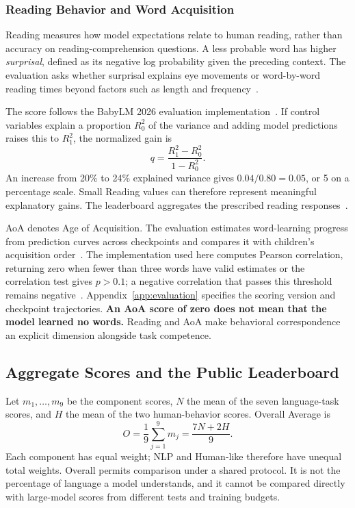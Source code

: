 \subsubsection{Reading Behavior and Word Acquisition}

Reading measures how model expectations relate to human reading, rather than accuracy on reading-comprehension questions. A less probable word has higher \emph{surprisal}, defined as its negative log probability given the preceding context. The evaluation asks whether surprisal explains eye movements or word-by-word reading times beyond factors such as length and frequency~\citep{devarda2024cloze}.

The score follows the BabyLM 2026 evaluation implementation~\citep{babylm2026evaluation}. If control variables explain a proportion $R_0^2$ of the variance and adding model predictions raises this to $R_1^2$, the normalized gain is
\begin{equation}
q=\frac{R_1^2-R_0^2}{1-R_0^2}.
\end{equation}
An increase from 20\% to 24\% explained variance gives $0.04/0.80=0.05$, or 5 on a percentage scale. Small Reading values can therefore represent meaningful explanatory gains. The leaderboard aggregates the prescribed reading responses~\citep{babylm2026leaderboard}.

AoA denotes Age of Acquisition. The evaluation estimates word-learning progress from prediction curves across checkpoints and compares it with children's acquisition order~\citep{chang2022word}. The implementation used here computes Pearson correlation, returning zero when fewer than three words have valid estimates or the correlation test gives $p>0.1$; a negative correlation that passes this threshold remains negative~\citep{babylm2026evaluation}. Appendix~\ref{app:evaluation} specifies the scoring version and checkpoint trajectories. \textbf{An AoA score of zero does not mean that the model learned no words.} Reading and AoA make behavioral correspondence an explicit dimension alongside task competence.

\subsection{Aggregate Scores and the Public Leaderboard}

Let $m_1,\ldots,m_9$ be the component scores, $N$ the mean of the seven language-task scores, and $H$ the mean of the two human-behavior scores. Overall Average is
\begin{equation}
O=\frac{1}{9}\sum_{j=1}^{9}m_j=\frac{7N+2H}{9}.
\label{eq:overall}
\end{equation}
Each component has equal weight; NLP and Human-like therefore have unequal total weights. Overall permits comparison under a shared protocol. It is not the percentage of language a model understands, and it cannot be compared directly with large-model scores from different tests and training budgets.

